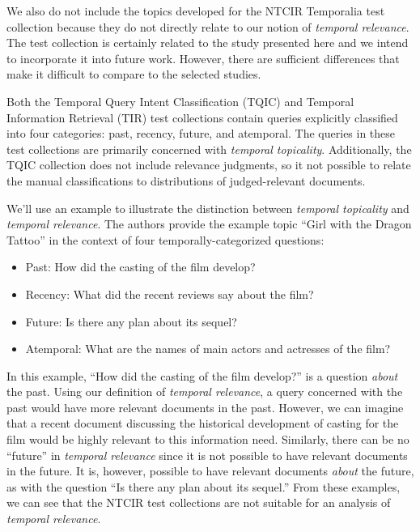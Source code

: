 \documentclass{sig-alternate}
\begin{document}
We also do not include the topics developed for the NTCIR Temporalia test collection \cite{Joho2014} because they do not directly relate to our notion of \emph{temporal relevance}. The test collection is certainly related to the study presented here and we intend to incorporate it into future work. However, there are sufficient differences that make it difficult to compare to the selected studies.

Both the Temporal Query Intent Classification (TQIC) and Temporal Information Retrieval (TIR) test collections contain queries explicitly classified into four categories: past, recency, future, and atemporal. The queries in these test collections are primarily concerned with \emph{temporal topicality}.  Additionally, the TQIC collection does not include relevance judgments, so it not possible to relate the manual classifications to distributions of judged-relevant documents.

We'll use an example to illustrate the distinction between \emph{temporal topicality} and \emph{temporal relevance}. The authors provide the example topic ``Girl with the Dragon Tattoo'' in the context of four temporally-categorized questions:

\begin{itemize}
\item Past: How did the casting of the film develop?
\item Recency: What did the recent reviews say about the film?
\item Future: Is there any plan about its sequel?
\item Atemporal: What are the names of main actors and actresses of the film?
\end{itemize}

In this example, ``How did the casting of the film develop?'' is a question \emph{about} the past. Using our definition of \emph{temporal relevance}, a query concerned with the past would have more relevant documents in the past. However, we can imagine that a recent document discussing the historical development of casting for the film would be highly relevant to this information need. Similarly, there can be no ``future'' in \emph{temporal relevance} since it is not possible to have relevant documents in the future. It is, however, possible to have relevant documents \emph{about} the future, as with the question ``Is there any plan about its sequel.'' From these examples, we can see that the NTCIR test collections are not suitable for an analysis of \emph{temporal relevance}.
\end{document}
